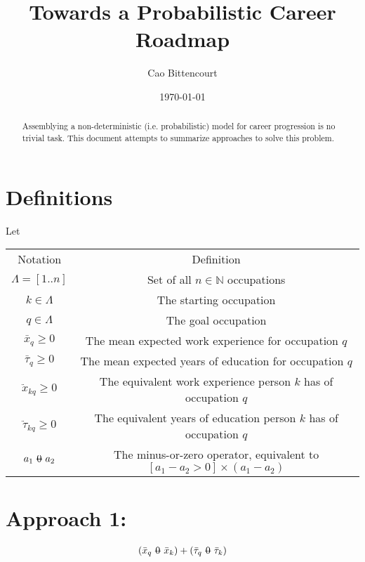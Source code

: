 \documentclass[12pt, a4paper]{article}
\title{
    Towards a Probabilistic Career Roadmap
}
\author{Cao Bittencourt}
\date{\today}
\makeatletter
\newcommand{\superimpose}[2]{{
  \ooalign{
    \hfil$\m@th#1\@firstoftwo#2$\hfil\cr
    \hfil$\m@th#1\@secondoftwo#2$\hfil\cr
  }
}}
\newcommand{\stack}[2]{\mathbin{\mathpalette\superimpose{{#1}{#2}}}}
\newcommand{\minuszero}{\stack{0}{-}}
\makeatother
\begin{document}
\maketitle

\begin{abstract}
  \noindent
  Assemblying a non-deterministic (i.e. probabilistic) model for career progression is no trivial task. This document attempts to summarize approaches to solve this problem.
\end{abstract}

\section{Definitions}
Let \newline \center
\begin{tabular}{cc}
  Notation                  & Definition                                                                             \\
  $\Lambda = [1 .. n]$      & Set of all $n \in \mathbb{N}$ occupations                                              \\
  $k \in \Lambda$           & The starting occupation                                                                \\
  $q \in \Lambda$           & The goal occupation                                                                    \\
  $\bar{x}_q \geq 0$        & The mean expected work experience for occupation $q$                                   \\
  $\bar{\tau}_q \geq 0$     & The mean expected years of education for occupation $q$                                \\
  $\ddot{x}_{kq} \geq 0$    & The equivalent work experience person $k$ has of occupation $q$                        \\
  $\ddot{\tau}_{kq} \geq 0$ & The equivalent years of education person $k$ has of occupation $q$                     \\
  $a_{1} \minuszero a_{2}$  & The minus-or-zero operator, equivalent to $[a_{1} - a_{2} > 0] \times (a_{1} - a_{2})$ \\
\end{tabular}

\section{Approach 1: }
\begin{gather}
  (\bar{x}_q \minuszero \bar{x}_k)
  +
  (\bar{\tau}_q \minuszero \bar{\tau}_k)
\end{gather}
\end{document}
